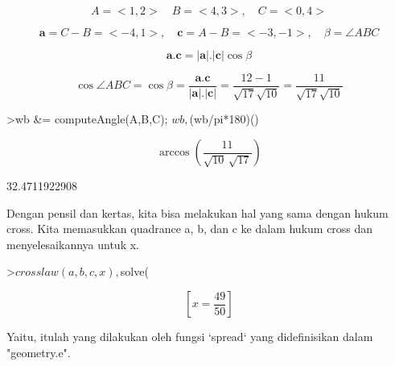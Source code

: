 \documentclass[12pt,arial,letterpaper]{book}
\begin{document}
\begin{eulercomment}
\begin{eulercomment}
\begin{eulercomment}
\begin{eulercomment}
\begin{eulercomment}
\begin{eulercomment}
\begin{eulercomment}
\begin{eulercomment}
\begin{eulercomment}
\begin{eulercomment}
\begin{eulercomment}
\begin{eulercomment}
\begin{eulercomment}
\begin{eulercomment}
\begin{eulercomment}
\begin{eulercomment}
\begin{eulercomment}
\begin{eulercomment}
\begin{eulercomment}
\begin{eulercomment}
\begin{eulercomment}
\begin{eulercomment}
\begin{eulercomment}
\begin{eulercomment}
\begin{eulercomment}
\begin{eulercomment}
\begin{eulercomment}
\begin{eulercomment}
\begin{eulercomment}
\end{eulercomment}
\begin{eulerformula}
\[
A=<1,2>\quad B=<4,3>,\quad C=<0,4>
\]
\end{eulerformula}
\begin{eulerformula}
\[
\mathbf{a}=C-B=<-4,1>,\quad \mathbf{c}=A-B=<-3,-1>,\quad \beta=\angle ABC
\]
\end{eulerformula}
\begin{eulerformula}
\[
\mathbf{a}.\mathbf{c}=|\mathbf{a}|.|\mathbf{c}|\cos \beta
\]
\end{eulerformula}
\begin{eulerformula}
\[
\cos \angle ABC =\cos\beta=\frac{\mathbf{a}.\mathbf{c}}{|\mathbf{a}|.|\mathbf{c}|}=\frac{12-1}{\sqrt{17}\sqrt{10}}=\frac{11}{\sqrt{17}\sqrt{10}}
\]
\end{eulerformula}
\begin{eulerprompt}
>wb &= computeAngle(A,B,C); $wb, $(wb/pi*180)()
\end{eulerprompt}
\begin{eulerformula}
\[
\arccos \left(\frac{11}{\sqrt{10}\,\sqrt{17}}\right)
\]
\end{eulerformula}
\begin{euleroutput}
  32.4711922908
\end{euleroutput}
\begin{eulercomment}
Dengan pensil dan kertas, kita bisa melakukan hal yang sama dengan
hukum cross. Kita memasukkan quadrance a, b, dan c ke dalam hukum
cross dan menyelesaikannya untuk x.
\end{eulercomment}
\begin{eulerprompt}
>$crosslaw(a,b,c,x), $solve(%
\end{eulerprompt}
\begin{eulerformula}
\[
\left[ x=\frac{49}{50} \right] 
\]
\end{eulerformula}
\begin{eulercomment}
Yaitu, itulah yang dilakukan oleh fungsi `spread` yang didefinisikan
dalam "geometry.e".

\end{eulercomment}
\end{eulercomment}
\end{eulercomment}
\end{eulercomment}
\end{eulercomment}
\end{eulercomment}
\end{eulercomment}
\end{eulercomment}
\end{eulercomment}
\end{eulercomment}
\end{eulercomment}
\end{eulercomment}
\end{eulercomment}
\end{eulercomment}
\end{eulercomment}
\end{eulercomment}
\end{eulercomment}
\end{eulercomment}
\end{eulercomment}
\end{eulercomment}
\end{eulercomment}
\end{eulercomment}
\end{eulercomment}
\end{eulercomment}
\end{eulercomment}
\end{eulercomment}
\end{eulercomment}
\end{eulercomment}
\end{eulercomment}
\end{document}
